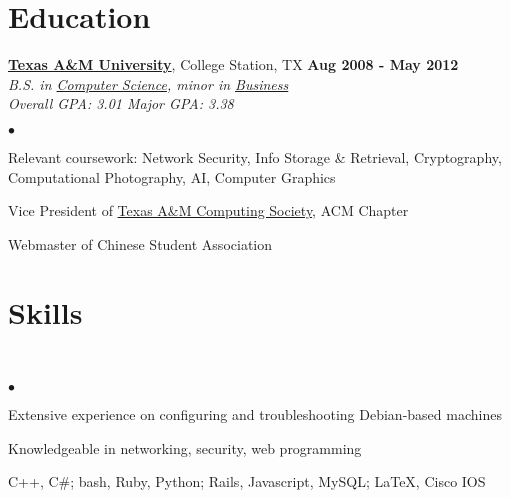 \documentclass[margin,line]{res}
\newenvironment{list2}
  {\vspace{-4mm}
   \begin{list}{$\bullet$}{
     \setlength{\itemsep}{0in}
     \setlength{\parsep}{0in} \setlength{\parskip}{0in}
     \setlength{\topsep}{0in} \setlength{\partopsep}{0in}
     \setlength{\leftmargin}{0.18in}}}
  {\end{list}}
\begin{document}
\begin{resume}
\section{\sc Education}
{\bf \href{http://tamu.edu}{Texas A\&M University}}, College Station, TX \hfill {\bf Aug 2008 - May 2012} \\
{\em B.S. in \href{http://cs.tamu.edu}{Computer Science}, minor in \href{http://mays.tamu.edu}{Business}} \\
{\em Overall GPA: 3.01 \hspace{5mm} Major GPA: 3.38} \\
\begin{list2}
\item Relevant coursework: Network Security, Info Storage \& Retrieval,
 Cryptography, Computational Photography, AI, Computer Graphics
\item Vice President of \href{http://tacs.tamu.edu}{Texas A\&M Computing Society}, ACM Chapter
\item Webmaster of Chinese Student Association
\end{list2}



%
%
\section{\sc Skills} 
\textcolor{white}{.}
\begin{list2}
\item Extensive experience on configuring and troubleshooting Debian-based machines
\item Knowledgeable in networking, security, web programming
\item C++, C\#; bash, Ruby, Python; Rails, Javascript, MySQL; \LaTeX, Cisco IOS
\end{list2}



\end{resume}
\end{document}
